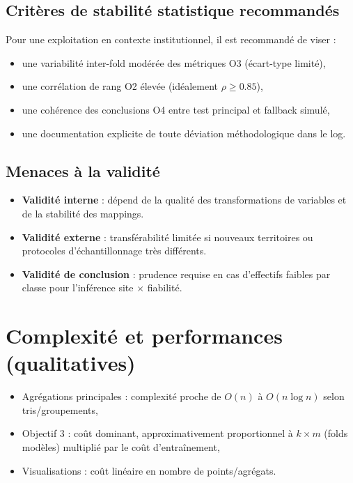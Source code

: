 \documentclass[11pt,a4paper]{article}
\begin{document}
\subsection{Critères de stabilit\'e statistique recommand\'es}
Pour une exploitation en contexte institutionnel, il est recommand\'e de viser :
\begin{itemize}[leftmargin=1.2cm]
  \item une variabilit\'e inter-fold mod\'er\'ee des m\'etriques O3 (\'ecart-type limit\'e),
  \item une corr\'elation de rang O2 \'elev\'ee (id\'ealement $\rho \geq 0.85$),
  \item une coh\'erence des conclusions O4 entre test principal et fallback simul\'e,
  \item une documentation explicite de toute d\'eviation m\'ethodologique dans le log.
\end{itemize}

\subsection{Menaces à la validit\'e}
\begin{itemize}[leftmargin=1.2cm]
  \item \textbf{Validit\'e interne} : d\'epend de la qualit\'e des transformations de variables et de la stabilit\'e des mappings.
  \item \textbf{Validit\'e externe} : transf\'erabilit\'e limit\'ee si nouveaux territoires ou protocoles d'\'echantillonnage très diff\'erents.
  \item \textbf{Validit\'e de conclusion} : prudence requise en cas d'effectifs faibles par classe pour l'inf\'erence site $\times$ fiabilit\'e.
\end{itemize}

\section{Complexit\'e et performances (qualitatives)}
\begin{itemize}[leftmargin=1.2cm]
  \item Agr\'egations principales : complexit\'e proche de $O(n)$ à $O(n\log n)$ selon tris/groupements,
  \item Objectif 3 : coût dominant, approximativement proportionnel à
  \(k \times m\) (folds \texttimes{} modèles) multipli\'e par le coût d'entraînement,
  \item Visualisations : coût lin\'eaire en nombre de points/agr\'egats.
\end{itemize}
\end{document}
